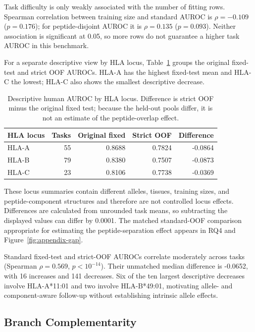Task difficulty is only weakly associated with the number of fitting rows. Spearman correlation between training size and standard AUROC is \(\rho=-0.109\) (\(p=0.176\)); for peptide-disjoint AUROC it is \(\rho=0.135\) (\(p=0.093\)). Neither association is significant at 0.05, so more rows do not guarantee a higher task AUROC in this benchmark.

For a separate descriptive view by HLA locus, Table~\ref{tab:human-hla-locus} groups the original fixed-test and strict OOF AUROCs. HLA-A has the highest fixed-test mean and HLA-C the lowest; HLA-C also shows the smallest descriptive decrease.

\begin{table}[tbp]
\centering
\caption{Descriptive human AUROC by HLA locus. Difference is strict OOF minus the original fixed test; because the held-out pools differ, it is not an estimate of the peptide-overlap effect.}
\label{tab:human-hla-locus}
\small
\begin{tabular}{lrrrr}
\toprule
HLA locus & Tasks & Original fixed & Strict OOF & Difference \\ 
\midrule
HLA-A & 55 & 0.8688 & 0.7824 & -0.0864 \\ 
HLA-B & 79 & 0.8380 & 0.7507 & -0.0873 \\ 
HLA-C & 23 & 0.8106 & 0.7738 & -0.0369 \\ 
\bottomrule
\end{tabular}
\end{table}

These locus summaries contain different alleles, tissues, training sizes, and peptide-component structures and therefore are not controlled locus effects. Differences are calculated from unrounded task means, so subtracting the displayed values can differ by 0.0001. The matched standard-OOF comparison appropriate for estimating the peptide-separation effect appears in RQ4 and Figure~\ref{fig:appendix-gap}.

Standard fixed-test and strict-OOF AUROCs correlate moderately across tasks (Spearman \(\rho=0.569\), \(p<10^{-14}\)). Their unmatched median difference is -0.0652, with 16 increases and 141 decreases. Six of the ten largest descriptive decreases involve HLA-A*11:01 and two involve HLA-B*49:01, motivating allele- and component-aware follow-up without establishing intrinsic allele effects.

\subsection{Branch Complementarity}

